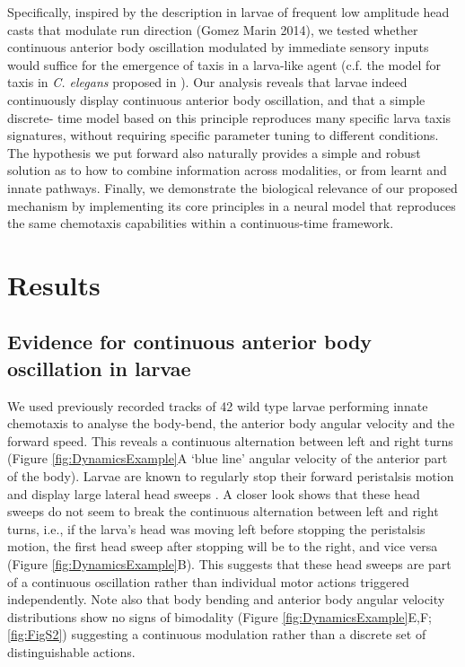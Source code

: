 \documentclass[11pt,a4paper]{article}
\begin{document}
Specifically, inspired by the description in larvae of frequent low amplitude head casts that modulate run direction (Gomez Marin 2014), we tested whether continuous anterior body oscillation modulated by immediate sensory inputs would suffice for the emergence of taxis in a larva-like agent (c.f. the model for taxis in {\it C. elegans} proposed in \citet{izquierdo2010evolution}). Our analysis reveals that larvae indeed continuously display continuous anterior body oscillation, and that a simple discrete- time model based on this principle reproduces many specific larva taxis signatures, without requiring specific parameter tuning to different conditions. The hypothesis we put forward also naturally provides a simple and robust solution as to how to combine information across modalities, or from learnt and innate pathways. Finally, we demonstrate the biological relevance of our proposed mechanism by implementing its  core principles in a neural model that reproduces the same chemotaxis capabilities within a continuous-time framework.

\section{Results}
\subsection{Evidence for continuous anterior body oscillation in larvae}
 We used previously recorded tracks of 42 wild type larvae performing innate chemotaxis \citep{gomez2012active} to analyse the body-bend, the anterior body angular velocity and the forward speed. This reveals a continuous alternation between left and right turns (Figure \ref{fig:DynamicsExample}A ‘blue line’ angular velocity of the anterior part of the body). Larvae are known to regularly stop their forward peristalsis motion and display large lateral head sweeps \citep{gomez2011active}. A closer look shows that these head sweeps do not seem to break the continuous alternation between left and right turns, i.e., if the larva’s head was moving left before stopping the peristalsis motion, the first head sweep after stopping will be to the right, and vice versa (Figure \ref{fig:DynamicsExample}B). This suggests that these head sweeps are part of a continuous oscillation rather than individual motor actions triggered independently. Note also that body bending and anterior body angular velocity distributions show no signs of bimodality (Figure \ref{fig:DynamicsExample}E,F; \ref{fig:FigS2}) suggesting a continuous modulation rather than a discrete set of distinguishable actions. 
\end{document}
